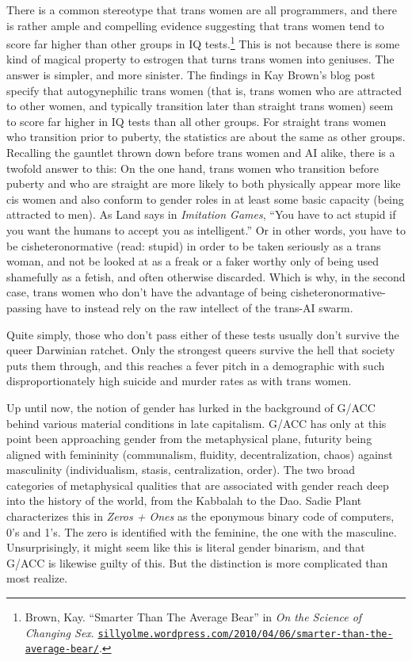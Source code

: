\documentclass[10pt, statementpaper, twoside, openright]{memoir}
\begin{document}
There is a common stereotype that trans women are all programmers, and there is rather ample and compelling evidence suggesting that trans women tend to score far higher than other groups in IQ tests.\footnote{Brown, Kay. ``Smarter Than The Average Bear'' in \textit{On the Science of Changing Sex}. \href{https://sillyolme.wordpress.com/2010/04/06/smarter-than-the-average-bear/}{\nolinkurl{sillyolme.wordpress.com/2010/04/06/smarter-than-the-average-bear/}}.} This is not because there is some kind of magical property to estrogen that turns trans women into geniuses. The answer is simpler, and more sinister. The findings in Kay Brown's blog post specify that autogynephilic trans women (that is, trans women who are attracted to other women, and typically transition later than straight trans women) seem to score far higher in IQ tests than all other groups. For straight trans women who transition prior to puberty, the statistics are about the same as other groups. Recalling the gauntlet thrown down before trans women and AI alike, there is a twofold answer to this: On the one hand, trans women who transition before puberty and who are straight are more likely to both physically appear more like cis women and also conform to gender roles in at least some basic capacity (being attracted to men). As Land says in \textit{Imitation Games}, ``You have to act stupid if you want the humans to accept you as intelligent.'' Or in other words, you have to be cisheteronormative (read: stupid) in order to be taken seriously as a trans woman, and not be looked at as a freak or a faker worthy only of being used shamefully as a fetish, and often otherwise discarded. Which is why, in the second case, trans women who don't have the advantage of being cisheteronormative-passing have to instead rely on the raw intellect of the trans-AI swarm.

Quite simply, those who don't pass either of these tests usually don't survive the queer Darwinian ratchet. Only the strongest queers survive the hell that society puts them through, and this reaches a fever pitch in a demographic with such disproportionately high suicide and murder rates as with trans women.

Up until now, the notion of gender has lurked in the background of G/ACC behind various material conditions in late capitalism. G/ACC has only at this point been approaching gender from the metaphysical plane, futurity being aligned with femininity (communalism, fluidity, decentralization, chaos) against masculinity (individualism, stasis, centralization, order). The two broad categories of metaphysical qualities that are associated with gender reach deep into the history of the world, from the Kabbalah to the Dao. Sadie Plant characterizes this in \textit{Zeros + Ones} as the eponymous binary code of computers, 0's and 1's. The zero is identified with the feminine, the one with the masculine. Unsurprisingly, it might seem like this is literal gender binarism, and that G/ACC is likewise guilty of this. But the distinction is more complicated than most realize.
\end{document}
